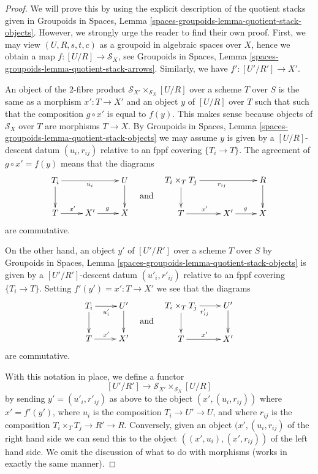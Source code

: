 \documentclass{stacks-project}
\theoremstyle{plain}
\theoremstyle{definition}
\theoremstyle{remark}
\numberwithin{equation}{subsection}
\begin{document}
\begin{proof}
We will prove this by using the explicit
description of the quotient stacks given in
Groupoids in Spaces, Lemma
\ref{spaces-groupoids-lemma-quotient-stack-objects}.
However, we strongly urge the reader to find their own proof.
First, we may view $(U, R, s, t, c)$ as a groupoid in
algebraic spaces over $X$, hence we obtain a map
$f : [U/R] \to \mathcal{S}_X$, see
Groupoids in Spaces, Lemma \ref{spaces-groupoids-lemma-quotient-stack-arrows}.
Similarly, we have $f' : [U'/R'] \to X'$.

\medskip\noindent
An object of the $2$-fibre product
$\mathcal{S}_{X'} \times_{\mathcal{S}_X} [U/R]$ over a scheme $T$ over $S$
is the same as a morphism $x' : T \to X'$ and an object $y$ of $[U/R]$ over $T$
such that such that the composition $g \circ x'$ is equal to $f(y)$.
This makes sense because objects of $\mathcal{S}_X$ over $T$
are morphisms $T \to X$. By Groupoids in Spaces, Lemma
\ref{spaces-groupoids-lemma-quotient-stack-objects}
we may assume $y$ is given by a $[U/R]$-descent datum $(u_i, r_{ij})$
relative to an fppf covering $\{T_i \to T\}$.
The agreement of $g \circ x' = f(y)$ means that the diagrams
$$
\vcenter{
\xymatrix{
T_i \ar[rr]_{u_i} \ar[d] & & U \ar[d] \\
T \ar[r]^{x'} & X' \ar[r]^g & X
}
}
\quad\text{and}\quad
\vcenter{
\xymatrix{
T_i \times_T T_j \ar[rr]_{r_{ij}} \ar[d] & & R \ar[d] \\
T \ar[r]^{x'} & X' \ar[r]^g & X
}
}
$$
are commutative.

\medskip\noindent
On the other hand, an object $y'$ of $[U'/R']$ over a scheme $T$ over $S$
by Groupoids in Spaces, Lemma
\ref{spaces-groupoids-lemma-quotient-stack-objects}
is given by a $[U'/R']$-descent datum $(u'_i, r'_{ij})$
relative to an fppf covering $\{T_i \to T\}$.
Setting $f'(y') = x' : T \to X'$ we see that
the diagrams
$$
\vcenter{
\xymatrix{
T_i \ar[r]_{u'_i} \ar[d] & U' \ar[d] \\
T \ar[r]^{x'} & X'
}
}
\quad\text{and}\quad
\vcenter{
\xymatrix{
T_i \times_T T_j \ar[r]_{r'_{ij}} \ar[d] & U' \ar[d] \\
T \ar[r]^{x'} & X'
}
}
$$
are commutative.

\medskip\noindent
With this notation in place, we define a functor
$$
[U'/R'] \longrightarrow \mathcal{S}_{X'} \times_{\mathcal{S}_X} [U/R]
$$
by sending $y' = (u'_i, r'_{ij})$ as above to the object
$(x', (u_i, r_{ij}))$ where $x' = f'(y')$, where
$u_i$ is the composition $T_i \to U' \to U$, and where
$r_{ij}$ is the composition $T_i \times_T T_j \to R' \to R$.
Conversely, given an object $(x', (u_i, r_{ij})$
of the right hand side we can send this to the object
$((x', u_i), (x', r_{ij}))$ of the left hand side.
We omit the discussion of what to do with morphisms (works
in exactly the same manner).
\end{proof}
\end{document}
